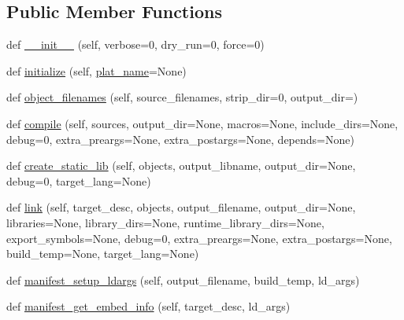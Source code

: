 \subsection*{Public Member Functions}
\begin{DoxyCompactItemize}
\item 
def \hyperlink{classsetuptools_1_1__distutils_1_1msvc9compiler_1_1MSVCCompiler_a976db4ad6cbc43c1c92d567d40d61f8f}{\+\_\+\+\_\+init\+\_\+\+\_\+} (self, verbose=0, dry\+\_\+run=0, force=0)
\item 
def \hyperlink{classsetuptools_1_1__distutils_1_1msvc9compiler_1_1MSVCCompiler_ac9a86d898b22d9a2abc2208d320ecd78}{initialize} (self, \hyperlink{classsetuptools_1_1__distutils_1_1msvc9compiler_1_1MSVCCompiler_a566af5759a43d75dd7c8e28e5ca99dcd}{plat\+\_\+name}=None)
\item 
def \hyperlink{classsetuptools_1_1__distutils_1_1msvc9compiler_1_1MSVCCompiler_a01639830bbdfc3434792f7a7fd0eff3b}{object\+\_\+filenames} (self, source\+\_\+filenames, strip\+\_\+dir=0, output\+\_\+dir=\textquotesingle{}\textquotesingle{})
\item 
def \hyperlink{classsetuptools_1_1__distutils_1_1msvc9compiler_1_1MSVCCompiler_a8ed1af33b4f9e03527e5a4d1aeb0f0a6}{compile} (self, sources, output\+\_\+dir=None, macros=None, include\+\_\+dirs=None, debug=0, extra\+\_\+preargs=None, extra\+\_\+postargs=None, depends=None)
\item 
def \hyperlink{classsetuptools_1_1__distutils_1_1msvc9compiler_1_1MSVCCompiler_ac6b97e0c92ce7cc04d96d794e2dfc865}{create\+\_\+static\+\_\+lib} (self, objects, output\+\_\+libname, output\+\_\+dir=None, debug=0, target\+\_\+lang=None)
\item 
def \hyperlink{classsetuptools_1_1__distutils_1_1msvc9compiler_1_1MSVCCompiler_a992df14bc1ce0871e1c9cc88ec17355d}{link} (self, target\+\_\+desc, objects, output\+\_\+filename, output\+\_\+dir=None, libraries=None, library\+\_\+dirs=None, runtime\+\_\+library\+\_\+dirs=None, export\+\_\+symbols=None, debug=0, extra\+\_\+preargs=None, extra\+\_\+postargs=None, build\+\_\+temp=None, target\+\_\+lang=None)
\item 
def \hyperlink{classsetuptools_1_1__distutils_1_1msvc9compiler_1_1MSVCCompiler_a92492c9536baa4980a641caa51112dfa}{manifest\+\_\+setup\+\_\+ldargs} (self, output\+\_\+filename, build\+\_\+temp, ld\+\_\+args)
\item 
def \hyperlink{classsetuptools_1_1__distutils_1_1msvc9compiler_1_1MSVCCompiler_ae0aa03208d7f76705050e92fa1dd42f7}{manifest\+\_\+get\+\_\+embed\+\_\+info} (self, target\+\_\+desc, ld\+\_\+args)

\end{DoxyCompactItemize}
